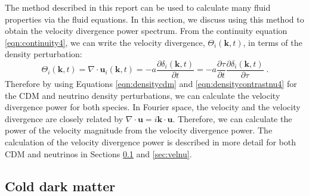 \documentclass{aastex}
\begin{document}
The method described in this report can be used to
calculate many fluid properties via the fluid equations.  
In this section, we discuss using this method to obtain 
the velocity divergence power
spectrum.  From the continuity equation
\eqref{eqn:continuity4}, we can write the velocity divergence, $\Theta_i(\mathbf{k},t)$, in terms
of the density perturbation:
\begin{equation}\label{eqn:veldivg}
  \Theta_i(\mathbf{k},t) = \nabla \cdot \mathbf{u}_i(\mathbf{k},t) = - a \frac{ \partial \delta_i(\mathbf{k},t)}{\partial
    t} = -a \frac{ \partial \tau}{ \partial t } \frac{ \partial
    \delta_i(\mathbf{k},t) }{ \partial \tau}\;.
\end{equation} 
Therefore by using Equations \eqref{eqn:densitycdm} and \eqref{eqn:densitycontrastnu4} for the
CDM and neutrino density perturbations, we can calculate the velocity divergence power for both species. 
In Fourier space, the velocity and the velocity divergence are closely
related by $ \nabla \cdot \mathbf{u} = i \mathbf{k} \cdot \mathbf{u}
$.  Therefore, we can calculate the power of the velocity magnitude from the velocity divergence power.
The calculation of the velocity divergence power is described in more detail for both
CDM
and neutrinos in Sections \ref{sec:velcdm} and \ref{sec:velnu}.

\subsection{ Cold dark matter }\label{sec:velcdm}
\end{document}
